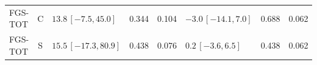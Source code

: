 \documentclass[10pt,a4paper]{article}
\begin{document}
\begin{longtable}{lcp{37mm}rrp{37mm}rr}
FGS-TOT & C & \(13.8\,[-7.5,45.0]\) & 0.344 & 0.104 & \(-3.0\,[-14.1,7.0]\) & 0.688 & 0.062\\
FGS-TOT & S & \(15.5\,[-17.3,80.9]\) & 0.438 & 0.076 & \(0.2\,[-3.6,6.5]\) & 0.438 & 0.062\\

\end{longtable}
\end{document}
